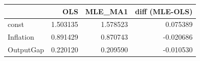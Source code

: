 \begin{tabular}{lrrr}
\toprule
 & OLS & MLE_MA1 & diff (MLE-OLS) \\
\midrule
const & 1.503135 & 1.578523 & 0.075389 \\
Inflation & 0.891429 & 0.870743 & -0.020686 \\
OutputGap & 0.220120 & 0.209590 & -0.010530 \\
\bottomrule
\end{tabular}
